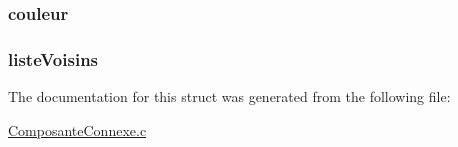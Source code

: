 \subsubsection[{\texorpdfstring{couleur}{couleur}}]{ couleur}\hypertarget{struct_composante_connexe_af0e152d09c13944935e00bef7a3c5111}{}\label{struct_composante_connexe_af0e152d09c13944935e00bef7a3c5111}
\subsubsection[{\texorpdfstring{liste\+Voisins}{listeVoisins}}]{ liste\+Voisins}\hypertarget{struct_composante_connexe_a7c2f71b57647800daa49d283625d1a03}{}\label{struct_composante_connexe_a7c2f71b57647800daa49d283625d1a03}


The documentation for this struct was generated from the following file\+:\begin{DoxyCompactItemize}
\item 
\hyperlink{_composante_connexe_8c}{Composante\+Connexe.\+c}\end{DoxyCompactItemize}
